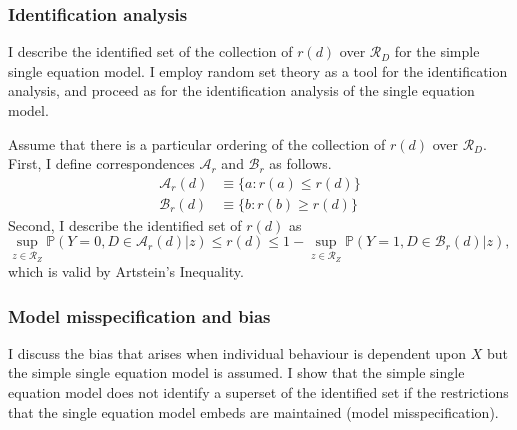 \documentclass[10pt,a4paper,twoside]{article}
\numberwithin{equation}{section}
\newcommand{\Art}{Artstein's Inequality}
\begin{document}
\subsubsection{Identification analysis}
I describe the identified set of the collection of $r(d)$ over $\mathcal{R}_D$ for the simple single equation model. I employ random set theory as a tool for the identification analysis, and proceed as for the identification analysis of the single equation model. 

Assume that there is a particular ordering of the collection of $r(d)$ over $\mathcal{R}_D$. First, I define correspondences $\mathcal{A}_r$ and $\mathcal{B}_r$ as follows.
\begin{align*}
\mathcal{A}_r(d)&\equiv\lbrace a : r(a)\leq r(d)\rbrace\\
\mathcal{B}_r(d)&\equiv\lbrace b : r(b)\geq r(d)\rbrace
\end{align*}
Second, I describe the identified set of $r(d)$ as
\begin{equation}
\sup_{z\in\mathcal{R}_Z}\mathbb{P}(Y=0,D\in\mathcal{A}_r(d)|z)\leq r(d)\leq 1-\sup_{z\in\mathcal{R}_Z}\mathbb{P}(Y=1,D\in\mathcal{B}_r(d)|z),\label{eq:rident}
\end{equation}
which is valid by {\Art}.
\subsubsection{Model misspecification and bias}
I discuss the bias that arises when individual behaviour is dependent upon $X$ but the simple single equation model is assumed. I show that the simple single equation model does not identify a superset of the identified set if the restrictions that the single equation model embeds are maintained (model misspecification).
\end{document}
